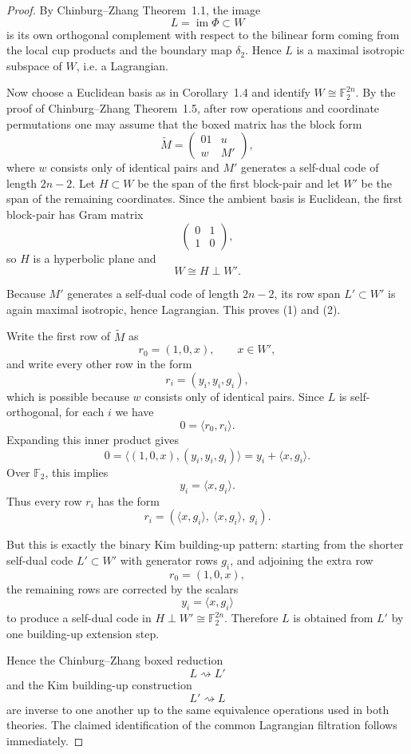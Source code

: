 \documentclass[12pt]{article}
\begin{document}
\begin{proof}
By Chinburg--Zhang Theorem~1.1, the image
\[
L=\operatorname{im}\Phi \subset W
\]
is its own orthogonal complement with respect to the bilinear form coming from the local cup products
and the boundary map \(\delta_2\). Hence \(L\) is a maximal isotropic subspace of \(W\), i.e. a
Lagrangian.

Now choose a Euclidean basis as in Corollary~1.4 and identify \(W\cong \mathbb F_2^{2n}\).
By the proof of Chinburg--Zhang Theorem~1.5, after row operations and coordinate permutations
one may assume that the boxed matrix has the block form
\[
\widetilde M=
\begin{pmatrix}
01 & u\\
w & M'
\end{pmatrix},
\]
where \(w\) consists only of identical pairs and \(M'\) generates a self-dual code of length \(2n-2\).
Let \(H\subset W\) be the span of the first block-pair and let \(W'\) be the span of the remaining
coordinates. Since the ambient basis is Euclidean, the first block-pair has Gram matrix
\[
\begin{pmatrix}
0&1\\
1&0
\end{pmatrix},
\]
so \(H\) is a hyperbolic plane and
\[
W\cong H\perp W'.
\]

Because \(M'\) generates a self-dual code of length \(2n-2\), its row span \(L'\subset W'\) is again
maximal isotropic, hence Lagrangian. This proves (1) and (2).

Write the first row of \(\widetilde M\) as
\[
r_0=(1,0,x), \qquad x\in W',
\]
and write every other row in the form
\[
r_i=(y_i,y_i,g_i),
\]
which is possible because \(w\) consists only of identical pairs. Since \(L\) is self-orthogonal,
for each \(i\) we have
\[
0=\langle r_0,r_i\rangle.
\]
Expanding this inner product gives
\[
0=\langle (1,0,x),(y_i,y_i,g_i)\rangle
   = y_i+\langle x,g_i\rangle.
\]
Over \(\mathbb F_2\), this implies
\[
y_i=\langle x,g_i\rangle.
\]
Thus every row \(r_i\) has the form
\[
r_i=(\langle x,g_i\rangle,\ \langle x,g_i\rangle,\ g_i).
\]

But this is exactly the binary Kim building-up pattern: starting from the shorter self-dual code
\(L'\subset W'\) with generator rows \(g_i\), and adjoining the extra row
\[
r_0=(1,0,x),
\]
the remaining rows are corrected by the scalars
\[
y_i=\langle x,g_i\rangle
\]
to produce a self-dual code in \(H\perp W'\cong \mathbb F_2^{2n}\).
Therefore \(L\) is obtained from \(L'\) by one building-up extension step.

Hence the Chinburg--Zhang boxed reduction
\[
L \rightsquigarrow L'
\]
and the Kim building-up construction
\[
L' \rightsquigarrow L
\]
are inverse to one another up to the same equivalence operations used in both theories.
The claimed identification of the common Lagrangian filtration follows immediately.
\end{proof}
\end{document}
